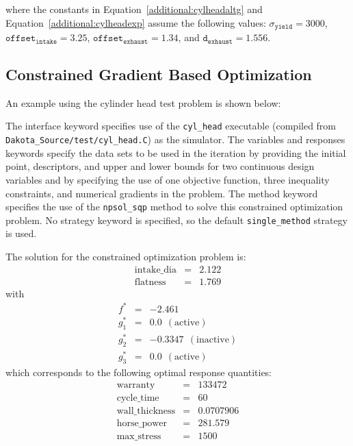 where the constants in Equation~\ref{additional:cylheadaltg} and
Equation~\ref{additional:cylheadexp} assume the following values:
$\sigma_{\mathtt{yield}}=3000$, $\mathtt{offset_{intake}}=3.25$,
$\mathtt{offset_{exhaust}}=1.34$, and $\mathtt{d_{exhaust}}=1.556$.

\subsection{Constrained Gradient Based Optimization}

An example using the cylinder head test problem is shown below:
\begin{center}
  \begin{small}
    \begin{bigbox}
    \end{bigbox}
  \end{small}
\end{center}

The interface keyword specifies use of the \texttt{cyl\_head}
executable (compiled from \texttt{Dakota\_Source/test/cyl\_head.C}) as the
simulator. The variables and responses keywords specify the data sets
to be used in the iteration by providing the initial point,
descriptors, and upper and lower bounds for two continuous design
variables and by specifying the use of one objective function, three
inequality constraints, and numerical gradients in the problem. The
method keyword specifies the use of the \texttt{npsol\_sqp} method to
solve this constrained optimization problem. No strategy keyword is
specified, so the default \texttt{single\_method} strategy is used.

The solution for the constrained optimization problem is:
\begin{eqnarray*}
    \mathrm{intake\_dia} &=& 2.122 \\
    \mathrm{flatness}    &=& 1.769
\end{eqnarray*}
with
\begin{eqnarray*}
      f^{\ast} &=& -2.461 \\
    g_1^{\ast} &=&  0.0    ~~\mathrm{(active)} \\
    g_2^{\ast} &=& -0.3347 ~~\mathrm{(inactive)} \\
    g_3^{\ast} &=&  0.0    ~~\mathrm{(active)}
\end{eqnarray*}
which corresponds to the following optimal response quantities:
\begin{eqnarray*}
    \mathrm{warranty}        &=& 133472 \\
    \mathrm{cycle\_time}     &=& 60 \\
    \mathrm{wall\_thickness} &=& 0.0707906 \\
    \mathrm{horse\_power}    &=& 281.579 \\
    \mathrm{max\_stress}     &=& 1500
\end{eqnarray*}

